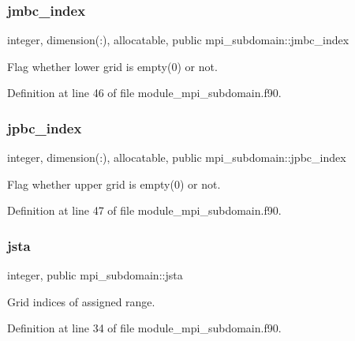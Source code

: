 \subsubsection{\texorpdfstring{jmbc\_index}{jmbc\_index}}
{\footnotesize\ttfamily integer, dimension(\+:), allocatable, public mpi\+\_\+subdomain\+::jmbc\+\_\+index}



Flag whether lower grid is empty(0) or not. 



Definition at line 46 of file module\+\_\+mpi\+\_\+subdomain.\+f90.

\mbox{\label{namespacempi__subdomain_a9adbfdd11c7e9fdb968bb8eef2b13c2b}} 
\subsubsection{\texorpdfstring{jpbc\_index}{jpbc\_index}}
{\footnotesize\ttfamily integer, dimension(\+:), allocatable, public mpi\+\_\+subdomain\+::jpbc\+\_\+index}



Flag whether upper grid is empty(0) or not. 



Definition at line 47 of file module\+\_\+mpi\+\_\+subdomain.\+f90.

\mbox{\label{namespacempi__subdomain_ac85bfba1caf77f9c3c0047fe9450fee6}} 
\subsubsection{\texorpdfstring{jsta}{jsta}}
{\footnotesize\ttfamily integer, public mpi\+\_\+subdomain\+::jsta}



Grid indices of assigned range. 



Definition at line 34 of file module\+\_\+mpi\+\_\+subdomain.\+f90.

\mbox{\label{namespacempi__subdomain_af9934313b1ccbcb09f30916df3326076}} 
